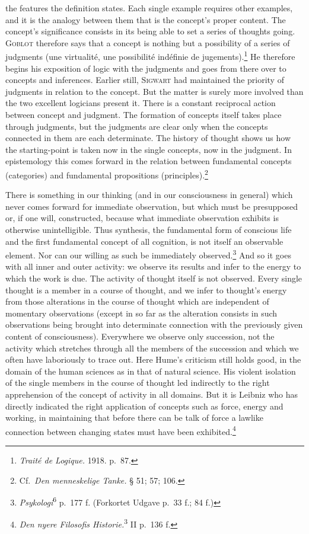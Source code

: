 \documentclass[12pt]{book}
\newcommand{\opage}[1]{\marginnote{\footnotesize\textit{[#1]}}}
\begin{document}
the features the definition states. Each single example requires other examples,
and it is the analogy between them that is the concept's proper content. The
concept's significance consists in its being able to set a series of thoughts
going. \textsc{Goblot} therefore says that a concept is nothing but a possibility
of a series of judgments (une virtualité, une possibilité indéfinie de
jugements).\footnote{\textit{Traité de Logique.} 1918. p.\ 87.} He therefore
begins his exposition of logic with the judgments and goes from there over to
concepts and inferences. Earlier still, \textsc{Sigwart} had maintained the
priority of judgments in relation to the concept. But the matter is surely more
involved than the two excellent logicians present it. There is a constant
reciprocal action between concept and judgment. The formation of concepts itself
takes place through judgments, but the judgments are clear only when the
concepts connected in them are each determinate. The history of thought shows us
how the starting-point is taken now in the single concepts, now in the judgment.
In epistemology this \opage{51}comes forward in the relation between fundamental concepts
(categories) and fundamental propositions
(principles).\footnote{Cf.\ \textit{Den menneskelige Tanke.} § 51; 57; 106.}

There is something in our thinking (and in our consciousness in general) which
never comes forward for immediate observation, but which must be presupposed
or, if one will, constructed, because what immediate observation exhibits is
otherwise unintelligible. Thus synthesis, the fundamental form of conscious life
and the first fundamental concept of all cognition, is not itself an observable
element. Nor can our willing as such be immediately
observed.\footnote{\textit{Psykologi}\textsuperscript{6} p.\ 177 f. (Forkortet
Udgave p.\ 33 f.; 84 f.)} And so it goes with all inner and outer activity: we
observe its results and infer to the energy to which the work is due. The
activity of thought itself is not observed. Every single thought is a member in
a course of thought, and we infer to thought's energy from those alterations in
the course of thought which are independent of momentary observations (except in
so far as the alteration consists in such observations being brought into
determinate connection with the previously given content of consciousness).
Everywhere we observe only succession, not the activity which stretches through
all the members of the succession and which we often have laboriously to trace
out. Here Hume's criticism still holds good, in the domain of the human sciences
as in that of natural science. His violent isolation of the single members in
the course of thought led indirectly to the right apprehension of the concept of
activity in all domains. But it is Leibniz who has directly indicated the right
application of concepts such as force, energy and working, in maintaining that
before there can be talk of force a lawlike connection between changing states
must have been exhibited.\footnote{\textit{Den nyere Filosofis
Historie.}\textsuperscript{3} II p.\ 136 f.}
\end{document}
